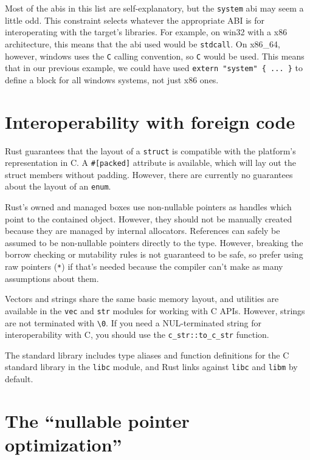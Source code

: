 \documentclass[]{article}
\begin{document}
Most of the abis in this list are self-explanatory, but the
\texttt{system} abi may seem a little odd. This constraint selects
whatever the appropriate ABI is for interoperating with the target's
libraries. For example, on win32 with a x86 architecture, this means
that the abi used would be \texttt{stdcall}. On x86\_64, however,
windows uses the \texttt{C} calling convention, so \texttt{C} would be
used. This means that in our previous example, we could have used
\texttt{extern "system" \{ ... \}} to define a block for all windows
systems, not just x86 ones.

\section{Interoperability with foreign
code}\label{interoperability-with-foreign-code}

Rust guarantees that the layout of a \texttt{struct} is compatible with
the platform's representation in C. A \texttt{\#{[}packed{]}} attribute
is available, which will lay out the struct members without padding.
However, there are currently no guarantees about the layout of an
\texttt{enum}.

Rust's owned and managed boxes use non-nullable pointers as handles
which point to the contained object. However, they should not be
manually created because they are managed by internal allocators.
References can safely be assumed to be non-nullable pointers directly to
the type. However, breaking the borrow checking or mutability rules is
not guaranteed to be safe, so prefer using raw pointers (\texttt{*}) if
that's needed because the compiler can't make as many assumptions about
them.

Vectors and strings share the same basic memory layout, and utilities
are available in the \texttt{vec} and \texttt{str} modules for working
with C APIs. However, strings are not terminated with
\texttt{\textbackslash{}0}. If you need a NUL-terminated string for
interoperability with C, you should use the \texttt{c\_str::to\_c\_str}
function.

The standard library includes type aliases and function definitions for
the C standard library in the \texttt{libc} module, and Rust links
against \texttt{libc} and \texttt{libm} by default.

\section{The ``nullable pointer
optimization''}\label{the-nullable-pointer-optimization}
\end{document}
